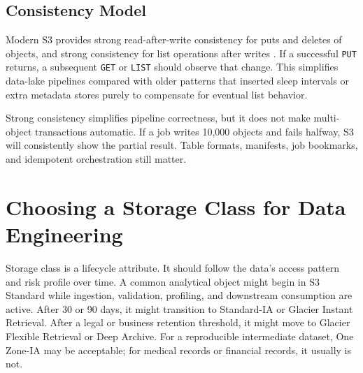 \subsection{Consistency Model}
Modern S3 provides strong read-after-write consistency for puts and deletes of objects, and strong consistency for list operations after writes \cite{awsS3Consistency}. If a successful \texttt{PUT} returns, a subsequent \texttt{GET} or \texttt{LIST} should observe that change. This simplifies data-lake pipelines compared with older patterns that inserted sleep intervals or extra metadata stores purely to compensate for eventual list behavior.

\begin{tipbox}
Strong consistency simplifies pipeline correctness, but it does not make multi-object transactions automatic. If a job writes 10,000 objects and fails halfway, S3 will consistently show the partial result. Table formats, manifests, job bookmarks, and idempotent orchestration still matter.
\end{tipbox}

\section{Choosing a Storage Class for Data Engineering}
Storage class is a lifecycle attribute. It should follow the data's access pattern and risk profile over time. A common analytical object might begin in S3 Standard while ingestion, validation, profiling, and downstream consumption are active. After 30 or 90 days, it might transition to Standard-IA or Glacier Instant Retrieval. After a legal or business retention threshold, it might move to Glacier Flexible Retrieval or Deep Archive. For a reproducible intermediate dataset, One Zone-IA may be acceptable; for medical records or financial records, it usually is not.

